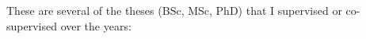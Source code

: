 


\newcommand{\Bern}{U. Bern}
\newcommand{\Groningen}{U. Groningen}

\newcommand{\super}[5]{\item {\bf #2}, #1. {\footnotesize(#3)}\\ #4 #5}
\newcommand{\inprogr}{in progress, }
\newcommand{\cosup}{co-supervised with }
\newcommand{\inprogrcosup}{{\footnotesize(in progress, co-supervised with O. Nierstrasz)}}
\newcommand{\detail}[1]{{\footnotesize(#1)}}


\newcommand{\yr}[1]{(#1)}

These are several of the theses (BSc, MSc, PhD) that I supervised or co-supervised over the years:

